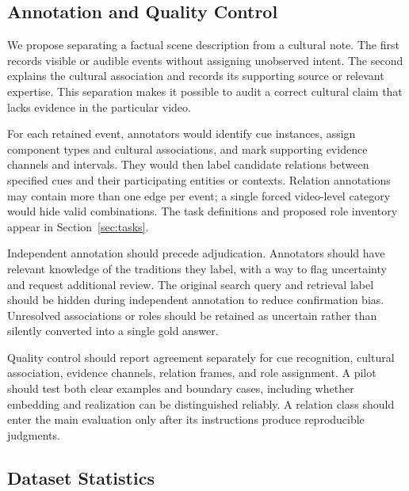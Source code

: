 \subsection{Annotation and Quality Control}
We propose separating a factual scene description from a cultural note.
The first records visible or audible events without assigning unobserved
intent. The second explains the cultural association and records its
supporting source or relevant expertise. This separation makes it
possible to audit a correct cultural claim that lacks evidence in the
particular video.

For each retained event, annotators would identify cue instances, assign
component types and cultural associations, and mark supporting evidence
channels and intervals. They would then label candidate relations between
specified cues and their participating entities or contexts. Relation annotations may contain more than one edge
per event; a single forced video-level category would hide valid
combinations. The task definitions and proposed role inventory appear in
Section~\ref{sec:tasks}.

Independent annotation should precede adjudication. Annotators should
have relevant knowledge of the traditions they label, with a way to flag
uncertainty and request additional review. The original search query and
retrieval label should be hidden during independent annotation to reduce
confirmation bias. Unresolved associations or roles should be retained
as uncertain rather than silently converted into a single gold answer.

Quality control should report agreement separately for cue recognition,
cultural association, evidence channels, relation frames, and role
assignment. A pilot should test both clear examples and boundary cases,
including whether embedding and realization can be distinguished
reliably. A relation class should enter the main evaluation only after
its instructions produce reproducible judgments.

\subsection{Dataset Statistics}
